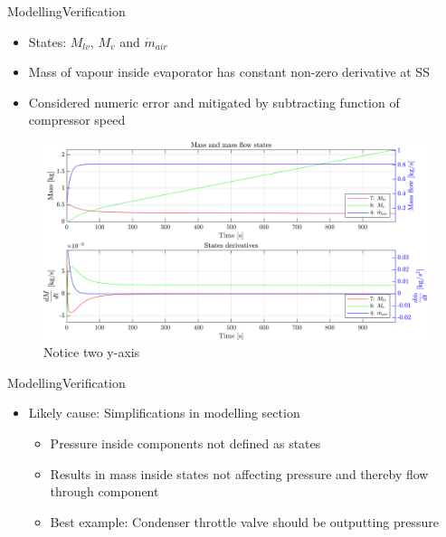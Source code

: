 \begin{frame}{Modelling}{Verification}
	\begin{itemize}
		\item States: $M_{lv}$, $M_v$ and $\dot{m}_{air}$
		\item Mass of vapour inside evaporator has constant non-zero derivative at SS
		\item Considered numeric error and mitigated by subtracting function of compressor speed
	\end{itemize}
	\begin{figure}[h]
		\centering
		\includegraphics[width=1\textwidth]{../Graphics/nonlin_sim_Mass_Mvfucked.png}
		\caption{Notice two y-axis}
		\label{fig:non_lin_sim_Mass_Mvfucked}
		
	\end{figure}
	
\end{frame}




\begin{frame}{Modelling}{Verification}
	\begin{itemize}
		\item Likely cause: Simplifications in modelling section
		\begin{itemize}
			\item Pressure inside components not defined as states
			\item Results in mass inside states not affecting pressure and thereby flow through component
			\item Best example: Condenser throttle valve should be outputting pressure
		\end{itemize}
	\end{itemize}

\end{frame}



